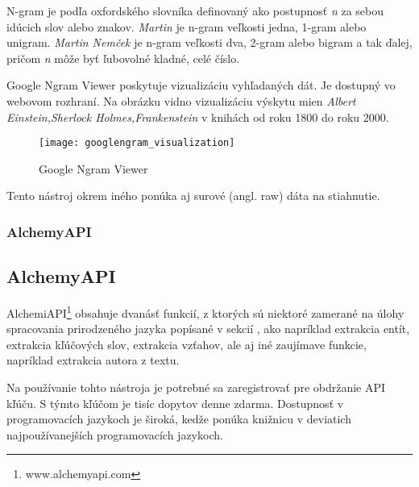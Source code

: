 N-gram je podľa oxfordského slovníka definovaný ako postupnosť \textit{n} za sebou idúcich slov alebo znakov. \textit{Martin} je n-gram veľkosti jedna, 1-gram alebo unigram. \textit{Martin Nemček} je n-gram veľkosti dva, 2-gram alebo bigram a tak ďalej, pričom \textit{n} môže byť ľubovolné kladné, celé číslo.

Google Ngram Viewer poskytuje vizualizáciu vyhľadaných dát. Je dostupný vo webovom rozhraní. Na obrázku  vidno vizualizáciu výskytu mien \textit{Albert Einstein,Sherlock Holmes,Frankenstein} v knihách od roku 1800 do roku 2000.

\begin{figure}[H]
\begin{center}\texttt{[image: googlengram\_visualization]}\end{center}
\caption[Google Ngram Viewer]{Google Ngram Viewer}\label{fig:googlengram_visualization}
\end{figure}

Tento nástroj okrem iného ponúka aj surové (angl. raw) dáta na stiahnutie.

%
%
{
	\subsubsection{AlchemyAPI}
}
{
	\subsection{AlchemyAPI}
}
\label{subsubsec:alchemyapi}
AlchemiAPI\footnote{www.alchemyapi.com} obsahuje dvanásť funkcií, z ktorých sú niektoré zamerané na úlohy spracovania prirodzeného jazyka popísané v sekcií , ako napríklad extrakcia entít, extrakcia kľúčových slov, extrakcia vzťahov, ale aj iné zaujímave funkcie, napríklad extrakcia autora z textu.

Na používanie tohto nástroja je potrebné sa zaregistrovať pre obdržanie API kľúču. S týmto kľúčom je tisíc dopytov denne zdarma. Dostupnosť v programovacích jazykoch je široká, kedže ponúka knižnicu v deviatich najpoužívanejších programovacích jazykoch.

